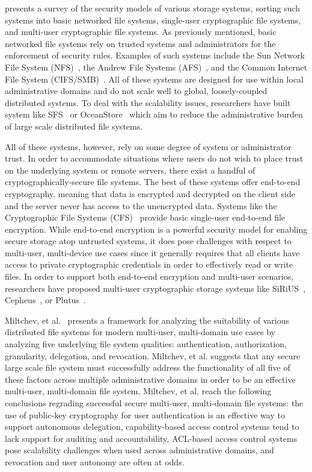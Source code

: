 \cite{Kher2005} presents a survey of the security models of various
storage systems, sorting such systems into basic networked file
systems, single-user cryptographic file systems, and multi-user
cryptographic file systems. As previously mentioned, basic networked
file systems rely on trusted systems and administrators for the
enforcement of security rules. Examples of such systems include the
Sun Network File System (NFS)~\cite{Sandberg1985}, the Andrew File
Systems (AFS)~\cite{Howard1988}, and the Common Internet File System
(CIFS/SMB)~\cite{microsoft-smb2}. All of these systems are designed
for use within local administrative domains and do not scale well to
global, loosely-coupled distributed systems. To deal with the
scalability issues, researchers have built system like
SFS~\cite{Mazieres1999} or OceanStore~\cite{Kubiatowicz2000} which aim
to reduce the administrative burden of large scale distributed file
systems.

All of these systems, however, rely on some degree of system or
administrator trust. In order to accommodate situations where users do
not wish to place trust on the underlying system or remote servers,
there exist a handful of cryptographically-secure file systems. The
best of these systems offer end-to-end cryptography, meaning that data
is encrypted and decrypted on the client side and the server never has
access to the unencrypted data.  Systems like the Cryptographic File
Systems (CFS)~\cite{Blaze1993} provide basic single-user end-to-end
file encryption. While end-to-end encryption is a powerful security
model for enabling secure storage atop untrusted systems, it does pose
challenges with respect to multi-user, multi-device use cases since it
generally requires that all clients have access to private
cryptographic credentials in order to effectively read or write
files. In order to support both end-to-end encryption and multi-user
scenarios, researchers have proposed multi-user cryptographic storage
systems like SiRiUS~\cite{Goh2003}, Cepheus~\cite{Fu1998}, or
Plutus~\cite{Kallahalla2003}.

Miltchev, et al.~\cite{Miltchev2008} presents a framework for
analyzing the suitability of various distributed file systems for
modern multi-user, multi-domain use cases by analyzing five underlying
file system qualities: authentication, authorization, granularity,
delegation, and revocation. Miltchev, et al. suggests that any secure
large scale file system must successfully address the functionality of
all five of these factors across multiple administrative domains in
order to be an effective multi-user, multi-domain file
system. Miltchev, et al. reach the following conclusions regrading
successful secure multi-user, multi-domain file systems: the use of
public-key cryptography for user authentication is an effective way to
support autonomous delegation, capability-based access control systems
tend to lack support for auditing and accountability, ACL-based access
control systems pose scalability challenges when used across
administrative domains, and revocation and user autonomy are often at
odds.

